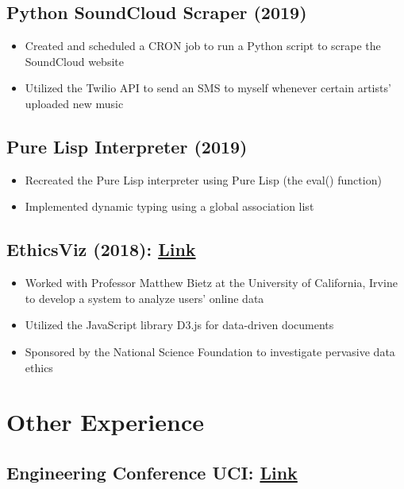 \documentclass[10pt]{article}
\begin{document}
\subsection{Python SoundCloud Scraper (2019)}

\begin{itemize}
	\setlength\itemsep{0em}
	\item Created and scheduled a CRON job to run a Python script to scrape the SoundCloud website
	\item Utilized the Twilio API to send an SMS to myself whenever certain artists' uploaded new music
\end{itemize}

\subsection{Pure Lisp Interpreter (2019)}

\begin{itemize}
	\setlength\itemsep{0em}
	\item Recreated the Pure Lisp interpreter using Pure Lisp (the eval() function)
	\item Implemented dynamic typing using a global association list
\end{itemize}

\subsection{EthicsViz (2018): \href{https://pervade.umd.edu/}{Link}}

\begin{itemize}
	\setlength\itemsep{0em}
	\item Worked with Professor Matthew Bietz at the University of California, Irvine to develop a system to analyze users' online data
	\item Utilized the JavaScript library D3.js for data-driven documents
	\item Sponsored by the National Science Foundation to investigate pervasive data ethics
\end{itemize}
\section{Other Experience}

\subsection{Engineering Conference UCI: \href{https://escholarship.org/uc/item/3hm5q8b8}{Link}}
\end{document}
